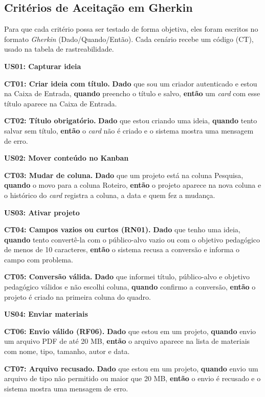 \subsection{Critérios de Aceitação em Gherkin}

Para que cada critério possa ser testado de forma objetiva, eles foram escritos no formato \textit{Gherkin} (Dado/Quando/Então). Cada cenário recebe um código (CT), usado na tabela de rastreabilidade.

\begin{small}

\textbf{US01: Capturar ideia}

\textbf{CT01: Criar ideia com título.} \textbf{Dado} que sou um criador autenticado e estou na Caixa de Entrada, \textbf{quando} preencho o título e salvo, \textbf{então} um \textit{card} com esse título aparece na Caixa de Entrada.

\textbf{CT02: Título obrigatório.} \textbf{Dado} que estou criando uma ideia, \textbf{quando} tento salvar sem título, \textbf{então} o \textit{card} não é criado e o sistema mostra uma mensagem de erro.

\textbf{US02: Mover conteúdo no Kanban}

\textbf{CT03: Mudar de coluna.} \textbf{Dado} que um projeto está na coluna Pesquisa, \textbf{quando} o movo para a coluna Roteiro, \textbf{então} o projeto aparece na nova coluna e o histórico do \textit{card} registra a coluna, a data e quem fez a mudança.

\textbf{US03: Ativar projeto}

\textbf{CT04: Campos vazios ou curtos (RN01).} \textbf{Dado} que tenho uma ideia, \textbf{quando} tento convertê-la com o público-alvo vazio ou com o objetivo pedagógico de menos de 10 caracteres, \textbf{então} o sistema recusa a conversão e informa o campo com problema.

\textbf{CT05: Conversão válida.} \textbf{Dado} que informei título, público-alvo e objetivo pedagógico válidos e não escolhi coluna, \textbf{quando} confirmo a conversão, \textbf{então} o projeto é criado na primeira coluna do quadro.

\textbf{US04: Enviar materiais}

\textbf{CT06: Envio válido (RF06).} \textbf{Dado} que estou em um projeto, \textbf{quando} envio um arquivo PDF de até 20 MB, \textbf{então} o arquivo aparece na lista de materiais com nome, tipo, tamanho, autor e data.

\textbf{CT07: Arquivo recusado.} \textbf{Dado} que estou em um projeto, \textbf{quando} envio um arquivo de tipo não permitido ou maior que 20 MB, \textbf{então} o envio é recusado e o sistema mostra uma mensagem de erro.


\end{small}
